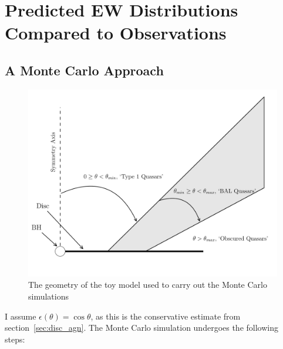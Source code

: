 






\section{Predicted EW Distributions Compared to Observations}
\label{sec:mc_angular}

\subsection{A Monte Carlo Approach}

\begin{figure}
\centering
\includegraphics[width=1.0\textwidth]{figures/ewpaper/fig2_cartoon.png}
\caption
{
The geometry of the toy model used to carry out the Monte Carlo simulations
}
\label{fig:cartoon}
\end{figure}

I assume $\epsilon(\theta) = \cos \theta$, as this is the conservative estimate
from section~\ref{sec:disc_agn}. 
The Monte Carlo simulation undergoes the following steps:

